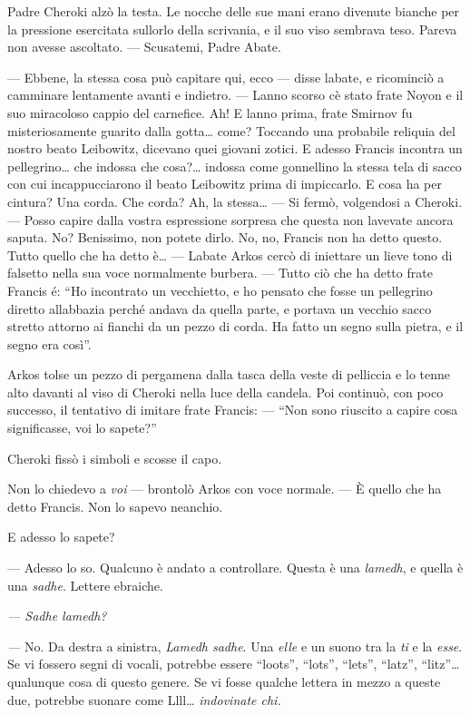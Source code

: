 Padre Cheroki alzò la testa. Le nocche delle sue mani erano divenute
bianche per la pressione esercitata sull\textquotesingle orlo della
scrivania, e il suo viso sembrava teso. Pareva non avesse ascoltato. ---
Scusatemi, Padre Abate.

--- Ebbene, la stessa cosa può capitare qui, ecco --- disse
l\textquotesingle abate, e ricominciò a camminare lentamente avanti e
indietro. --- L\textquotesingle anno scorso c\textquotesingle è stato
frate Noyon e il suo miracoloso cappio del carnefice. Ah! E
l\textquotesingle anno prima, frate Smirnov fu misteriosamente guarito
dalla gotta\ldots{} come? Toccando una probabile reliquia del nostro
beato Leibowitz, dicevano quei giovani zotici. E adesso Francis incontra
un pellegrino\ldots{} che indossa che cosa?\ldots{} indossa come
gonnellino la stessa tela di sacco con cui incappucciarono il beato
Leibowitz prima di impiccarlo. E cosa ha per cintura? Una corda. Che
corda? Ah, la stessa\ldots{} --- Si fermò, volgendosi a Cheroki. ---
Posso capire dalla vostra espressione sorpresa che questa non
l\textquotesingle avevate ancora saputa. No? Benissimo, non potete
dirlo. No, no, Francis non ha detto questo. Tutto quello che ha detto
è\ldots{} --- L\textquotesingle abate Arkos cercò di iniettare un lieve
tono di falsetto nella sua voce normalmente burbera. --- Tutto ciò che
ha detto frate Francis é: ``Ho incontrato un vecchietto, e ho pensato
che fosse un pellegrino diretto all\textquotesingle abbazia perché
andava da quella parte, e portava un vecchio sacco stretto attorno ai
fianchi da un pezzo di corda. Ha fatto un segno sulla pietra, e il segno
era così''.

Arkos tolse un pezzo di pergamena dalla tasca della veste di pelliccia e
lo tenne alto davanti al viso di Cheroki nella luce della candela. Poi
continuò, con poco successo, il tentativo di imitare frate Francis: ---
``Non sono riuscito a capire cosa significasse, voi lo sapete?''

Cheroki fissò i simboli e scosse il capo.

Non lo chiedevo a \emph{voi} --- brontolò Arkos con voce normale. --- È
quello che ha detto Francis. Non lo sapevo neanch\textquotesingle io.

E adesso lo sapete?

--- Adesso lo so. Qualcuno è andato a controllare. Questa è una
\emph{lamedh}, e quella è una \emph{sadhe}. Lettere ebraiche.

\emph{--- Sadhe lamedh?}

\emph{---} No. Da destra a sinistra, \emph{Lamedh sadhe}. Una
\emph{elle} e un suono tra la \emph{ti} e la \emph{esse}. Se vi fossero
segni di vocali, potrebbe essere ``loots'', ``lots'', ``lets'',
``latz'', ``litz''\ldots{} qualunque cosa di questo genere. Se vi fosse
qualche lettera in mezzo a queste due, potrebbe suonare come
Llll\ldots{} \emph{indovinate chi.}


